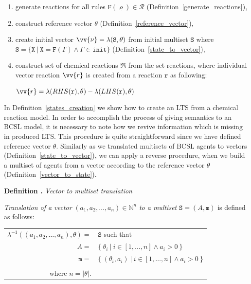 \documentclass[12pt, twoside]{fithesis2} %
\newcounter{counter}[section]
\renewcommand{\thecounter}{\thesection.\arabic{counter}}
\newenvironment{definition}[1]{\bigskip\refstepcounter{counter}\noindent\textbf{Definition \thecounter } \emph{#1} \par\nopagebreak \begin{itshape}}{\end{itshape}\bigskip}
\begin{document}
\begin{enumerate}
\item generate reactions for all rules $\mathtt{F}(\varrho) \in \mathcal{R}$ (Definition~\ref{generate_reactions}),
\item construct reference vector $\theta$ (Definition~\ref{reference_vector}),
\item create initial vector $\vv{\nu} = \lambda(\mathtt{S}, \theta)$ from initial multiset $\mathtt{S}$ where $\mathtt{S} = \{ \mathtt{X} ~|~ \mathtt{X} = \mathtt{F}(\Gamma) \wedge \Gamma \in \mathtt{init} \}$ (Definition~\ref{state_to_vector}),
\item construct set of chemical reactions $\mathfrak{R}$ from the set reactions, where individual vector reaction $\vv{r}$ is created from a reaction $\mathtt{r}$ as following:

\begin{center}
$\vv{r} = \lambda(RHS(\mathtt{r}), \theta) - \lambda(LHS(\mathtt{r}), \theta)$
\end{center}

\end{enumerate}

In Definition~\ref{states_creation} we show how to create an LTS from a chemical reaction model. In order to accomplish the process of giving semantics to an BCSL model, it is necessary to note how we revive information which is missing in produced LTS. This procedure is quite straightforward since we have defined reference vector $\theta$. Similarly as we translated multisets of BCSL agents to vectors (Definition~\ref{state_to_vector}), we can apply a reverse procedure, when we build a multiset of agents from a vector according to the reference vector $\theta$ (Definition~\ref{vector_to_state}).

\begin{definition}{Vector to multiset translation}
\label{vector_to_state}

\emph{Translation of a vector} $(a_1, a_2, \ldots, a_n) \in \mathbb{N}^n$ \emph{to a multiset} $\mathtt{S} = (A, \mathtt{m})$ is defined as follows:

\begin{center}
\begin{tabular}{r@{\hskip 0.08cm}l}
$\lambda^{-1}((a_1, a_2, \ldots, a_n), \theta) =$ & $ \mathtt{S}$ such that\\
$A = $ & $ \{~ \theta_i ~|~ i \in [1, \ldots, n] \wedge a_i > 0 ~\}$\\

$\mathtt{m} = $& $ \{~ (\theta_i, a_i) ~|~ i \in [1, \ldots, n] \wedge a_i > 0 ~\}$\\
& \\
where $n = |\theta|$. &\\
\end{tabular}
\end{center}
\end{definition}
\end{document}
